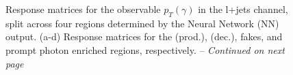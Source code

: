 \begin{figure}[!ht]
  \centering
  \quad\quad
  \quad\quad
  \quad\quad
  \caption[Short caption for LoF]{Response matrices for the observable $p_T(\gamma)$ in the l+jets channel, split across four regions determined by the Neural Network (NN) output. (a-d) Response matrices for the \tty (prod.), \tty (dec.), fakes, and prompt photon enriched regions, respectively. -- \emph{Continued on next page}}
  \label{fig:folding_input_response_ljet_pt1}
\end{figure}
